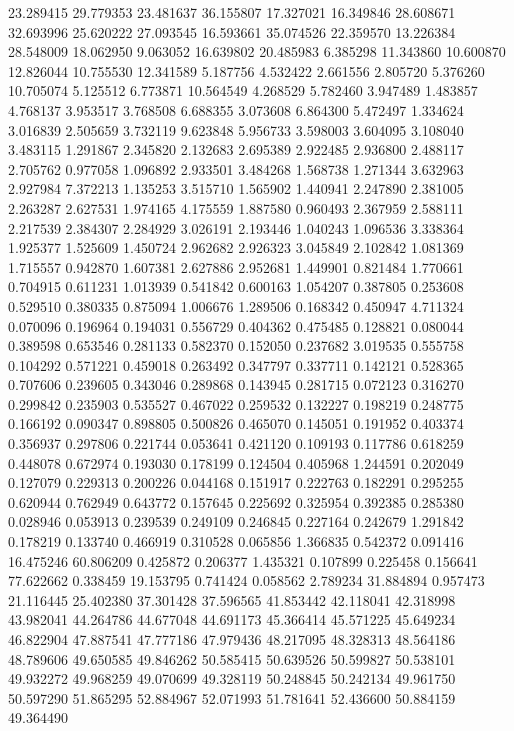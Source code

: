 23.289415
29.779353
23.481637
36.155807
17.327021
16.349846
28.608671
32.693996
25.620222
27.093545
16.593661
35.074526
22.359570
13.226384
28.548009
18.062950
9.063052
16.639802
20.485983
6.385298
11.343860
10.600870
12.826044
10.755530
12.341589
5.187756
4.532422
2.661556
2.805720
5.376260
10.705074
5.125512
6.773871
10.564549
4.268529
5.782460
3.947489
1.483857
4.768137
3.953517
3.768508
6.688355
3.073608
6.864300
5.472497
1.334624
3.016839
2.505659
3.732119
9.623848
5.956733
3.598003
3.604095
3.108040
3.483115
1.291867
2.345820
2.132683
2.695389
2.922485
2.936800
2.488117
2.705762
0.977058
1.096892
2.933501
3.484268
1.568738
1.271344
3.632963
2.927984
7.372213
1.135253
3.515710
1.565902
1.440941
2.247890
2.381005
2.263287
2.627531
1.974165
4.175559
1.887580
0.960493
2.367959
2.588111
2.217539
2.384307
2.284929
3.026191
2.193446
1.040243
1.096536
3.338364
1.925377
1.525609
1.450724
2.962682
2.926323
3.045849
2.102842
1.081369
1.715557
0.942870
1.607381
2.627886
2.952681
1.449901
0.821484
1.770661
0.704915
0.611231
1.013939
0.541842
0.600163
1.054207
0.387805
0.253608
0.529510
0.380335
0.875094
1.006676
1.289506
0.168342
0.450947
4.711324
0.070096
0.196964
0.194031
0.556729
0.404362
0.475485
0.128821
0.080044
0.389598
0.653546
0.281133
0.582370
0.152050
0.237682
3.019535
0.555758
0.104292
0.571221
0.459018
0.263492
0.347797
0.337711
0.142121
0.528365
0.707606
0.239605
0.343046
0.289868
0.143945
0.281715
0.072123
0.316270
0.299842
0.235903
0.535527
0.467022
0.259532
0.132227
0.198219
0.248775
0.166192
0.090347
0.898805
0.500826
0.465070
0.145051
0.191952
0.403374
0.356937
0.297806
0.221744
0.053641
0.421120
0.109193
0.117786
0.618259
0.448078
0.672974
0.193030
0.178199
0.124504
0.405968
1.244591
0.202049
0.127079
0.229313
0.200226
0.044168
0.151917
0.222763
0.182291
0.295255
0.620944
0.762949
0.643772
0.157645
0.225692
0.325954
0.392385
0.285380
0.028946
0.053913
0.239539
0.249109
0.246845
0.227164
0.242679
1.291842
0.178219
0.133740
0.466919
0.310528
0.065856
1.366835
0.542372
0.091416
16.475246
60.806209
0.425872
0.206377
1.435321
0.107899
0.225458
0.156641
77.622662
0.338459
19.153795
0.741424
0.058562
2.789234
31.884894
0.957473
21.116445
25.402380
37.301428
37.596565
41.853442
42.118041
42.318998
43.982041
44.264786
44.677048
44.691173
45.366414
45.571225
45.649234
46.822904
47.887541
47.777186
47.979436
48.217095
48.328313
48.564186
48.789606
49.650585
49.846262
50.585415
50.639526
50.599827
50.538101
49.932272
49.968259
49.070699
49.328119
50.248845
50.242134
49.961750
50.597290
51.865295
52.884967
52.071993
51.781641
52.436600
50.884159
49.364490
